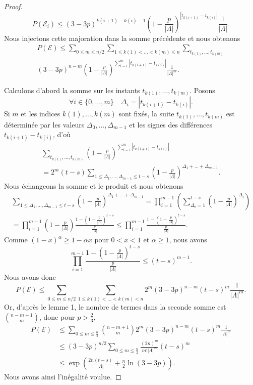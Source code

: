 \documentclass[titlepage,a4paper,12pt]{article}
\newcounter{d}
\newcounter{t}
\newcounter{p}
\newcounter{c}
\newcounter{a}
\newcounter{l}
\begin{document}
\begin{proof}
$$P(\mathcal{E}_i)\leqslant (3-3p)^{k(i+1)-k(i)-1}\left(1-\frac{p}{|\Lambda|}\right)^{|t_{k(i+1)}-t_{k(i)}|}\frac{1}{|\Lambda|}.$$
Nous injectons cette majoration dans la somme précédente et nous obtenons
\begin{multline*}
P(\mathcal{E}) \leqslant \sum_{0\leqslant m \leqslant n/2}\sum_{1\leqslant k(1)<\dots<k(m)\leqslant n}\sum_{t_{k(1)},\dots,t_{k(m)}}\\(3-3p)^{n-m}\left(1-\frac{p}{|\Lambda|}\right)^{\displaystyle \sum_{i=1}^{m}|t_{k(i+1)}-t_{k(i)}|}\frac{1}{|\Lambda|^m}.
\end{multline*}

Calculons d'abord la somme sur les instants $t_{k(1)},\dots,t_{k(m)}$. Posons $$\forall i \in\{0,\dots,m\}\quad\Delta_i = |t_{k(i+1)}-t_{k(i)}|.$$ Si $m$ et les indices $k(1),\dots,k(m)$ sont fixés, la suite $t_{k(1)},\dots,t_{k(m)}$ est déterminée par les valeurs $\Delta_0,\dots,\Delta_{m-1}$ et les signes des différences $t_{k(i+1)}-t_{k(i)}$, d'où 
\begin{multline*}\sum_{t_{k(1)},\dots,t_{k(m)}}\left(1-\frac{p}{|\Lambda|}\right)^{\displaystyle\sum_{i=1}^{m}|t_{k(i+1)}-t_{k(i)}|} \\ = 2^{m}(t-s)\sum_{1\leqslant\Delta_1,\dots,\Delta_{m-1}\leqslant t-s}\left(1-\frac{p}{|\Lambda|}\right)^{\Delta_1+\dots+\Delta_{m-1}}.
\end{multline*}
Nous échangeons la somme et le produit et nous obtenons
\begin{multline*}\sum_{1\leqslant\Delta_1,\dots,\Delta_{m-1}\leqslant t-s}\left(1-\frac{p}{|\Lambda|}\right)^{\Delta_1+\dots+\Delta_{m-1}} = \prod_{i=1}^{m-1}\left(\sum_{\Delta_i = 1}^{t-s}\left(1-\frac{p}{|\Lambda|}\right)^{\Delta_i}\right)\\= \prod_{i=1}^{m-1}\left(1-\frac{p}{|\Lambda|}\right)\frac{\displaystyle1-\left(1-\frac{p}{|\Lambda|}\right)^{t-s}}{\displaystyle\frac{p}{|\Lambda|}}\leqslant \prod_{i=1}^{m-1}\frac{\displaystyle1-\left(1-\frac{p}{|\Lambda|}\right)^{t-s}}{\displaystyle\frac{p}{|\Lambda|}}.
\end{multline*}
Comme $(1-x)^\alpha \geqslant 1-\alpha x$ pour $0<x<1$ et $\alpha\geqslant 1$, nous avons 
$$ \prod_{i=1}^{m-1}\frac{\displaystyle 1-\left(1-\frac{p}{|\Lambda|}\right)^{t-s}}{\displaystyle\frac{p}{|\Lambda|}} \leqslant(t-s)^{m-1}.
$$
Nous avons donc
$$P(\mathcal{E}) \leqslant\sum_{0\leqslant m \leqslant n/2}\sum_{1\leqslant k(1)<\dots<k(m)<n} 2^{m}(3-3p)^{n-m}(t-s)^m\frac{1}{|\Lambda|^m}.
$$
Or, d'après le lemme 1, le nombre de termes dans la seconde somme est $\binom{n-m+1}{m}$, donc pour $p> \frac{2}{3}$,
\begin{align*}P\left(\mathcal{E}\right)& \leqslant\sum_{0\leqslant m \leqslant\frac{n}{2}}\binom{n-m+1}{m} 2^{m}(3-3p)^{n-m}(t-s)^m\frac{1}{|\Lambda|^m}\\
& \leqslant (3-3p)^{n/2}\sum_{0\leqslant m \leqslant\frac{n}{2}}\frac{(2n)^m}{m!|\Lambda|^m}(t-s)^m \\
&\leqslant \exp\left(\frac{2n(t-s)}{|\Lambda|}+\frac{n}{2}\ln(3-3p)\right).
\end{align*}
Nous avons ainsi l'inégalité voulue.
\end{proof}
\end{document}
